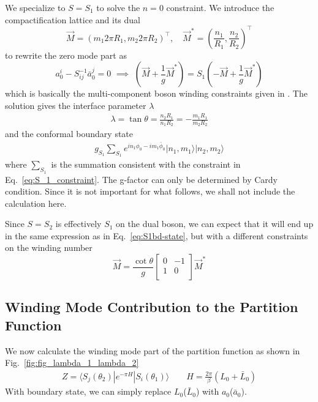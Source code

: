 We specialize to $S = S_1$ to solve the $ n = 0$ constraint. We introduce the compactification lattice and its dual\cite{affleck_quantum_2001,oshikawa_boundary_2010}
\begin{equation}
\label{eq:lattice}
\vec{M} = (m_1 2 \pi R_1, m_2 2\pi  R_2)^\top, \quad  \vec{M}^* = (\frac{n_1}{R_1}, \frac{n_2}{R_2})^\top
\end{equation}
to rewrite the zero mode part as 
\begin{equation}
  a_0^i - S^{-1} _{ij} \bar{a}_{0}^j = 0 \,\, \implies \,\, ( \vec{M} + \frac{1}{g}\vec{M}^* ) = S_1 ( -\vec{M} + \frac{1}{g}\vec{M}^* )
\end{equation}
which is basically the multi-component boson winding constraints given in . The solution gives the interface parameter $\lambda$
\begin{equation}
\begin{aligned}
\label{eq:S_1_constraint}
\lambda = \tan\theta=\frac{n_2R_1}{n_1R_2}=-\frac{m_1R_1}{m_2R_2}
\end{aligned}
\end{equation}
and the conformal boundary state
\begin{equation}\begin{aligned}
\label{eq:S1bd-state}
g_{S_1}\sum_{S_1}e^{in_1\phi_0-im_1\bar{\phi}_0}|n_1,m_1\rangle|n_2,m_2\rangle
\end{aligned}\end{equation}
where $\sum_{S_1}$ is the summation consistent with the constraint in Eq.~\eqref{eq:S_1_constraint}. The g-factor can only be determined by Cardy condition\cite{cardy_boundary_2004}. Since it is not important for what follows, we shall not include the calculation here. 

Since $S = S_2$ is effectively $S_1$ on the dual boson, we can expect that it will end up in the same expression as in Eq.~\eqref{eq:S1bd-state}, but with a different constraints on the winding number
\begin{equation}
\vec{M} = \frac{\cot \theta}{g} 
\begin{bmatrix}
0 & -1\\
1 & 0 \\                                
\end{bmatrix}
\vec{M}^*
\end{equation}



\subsection{Winding Mode Contribution to the Partition Function}
\label{app_sub:winding_contribution}
We now calculate the winding mode part of the partition function as shown in Fig.~\ref{fig:fig_lambda_1_lambda_2}
\begin{equation}\begin{aligned}
Z=\langle S_j( \theta_2 )|e^{-\pi H}|S_i(\theta_1 )\rangle\qquad H=\frac{2\pi}{\beta}(L_0+\bar{L}_0)
\end{aligned}\end{equation}
With boundary state, we can simply replace $L_0$($\bar{L}_0$) with $a_0$($\bar{a}_0$). 

